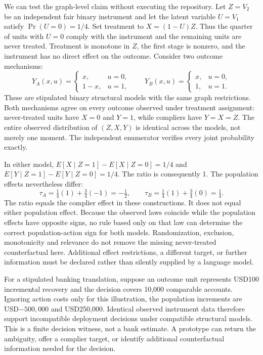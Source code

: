 We can test the graph-level claim without executing the repository. Let $Z=V_2$ be an independent fair binary instrument and let the latent variable $U=V_1$ satisfy $\Pr(U=0)=1/4$. Set treatment to $X=(1-U)Z$. Thus the quarter of units with $U=0$ comply with the instrument and the remaining units are never treated. Treatment is monotone in $Z$, the first stage is nonzero, and the instrument has no direct effect on the outcome. Consider two outcome mechanisms:
\[
Y_A(x,u)=\begin{cases}x,&u=0,\\1-x,&u=1,\end{cases}
\qquad
Y_B(x,u)=\begin{cases}x,&u=0,\\1,&u=1.\end{cases}
\]
These are stipulated binary structural models with the same graph restrictions. Both mechanisms agree on every outcome observed under treatment assignment: never-treated units have $X=0$ and $Y=1$, while compliers have $Y=X=Z$. The entire observed distribution of $(Z,X,Y)$ is identical across the models, not merely one moment. The independent enumerator verifies every joint probability exactly.\citep{exec25_bor_reference}

In either model, $E[X\mid Z=1]-E[X\mid Z=0]=1/4$ and $E[Y\mid Z=1]-E[Y\mid Z=0]=1/4$. The ratio is consequently 1. The population effects nevertheless differ:
\[
\tau_A=\tfrac14(1)+\tfrac34(-1)=-\tfrac12,
\qquad
\tau_B=\tfrac14(1)+\tfrac34(0)=\tfrac14.
\]
The ratio equals the complier effect in these constructions. It does not equal either population effect. Because the observed laws coincide while the population effects have opposite signs, no rule based only on that law can determine the correct population-action sign for both models. Randomization, exclusion, monotonicity and relevance do not remove the missing never-treated counterfactual here. Additional effect restrictions, a different target, or further information must be declared rather than silently supplied by a language model.\citep{exec25_bor_reference}

For a stipulated banking translation, suppose an outcome unit represents USD100 incremental recovery and the decision covers 10,000 comparable accounts. Ignoring action costs only for this illustration, the population increments are USD$-500{,}000$ and USD250,000. Identical observed instrument data therefore support incompatible deployment decisions under compatible structural models. This is a finite decision witness, not a bank estimate. A prototype can return the ambiguity, offer a complier target, or identify additional counterfactual information needed for the decision.\citep{exec25_bor_reference}


